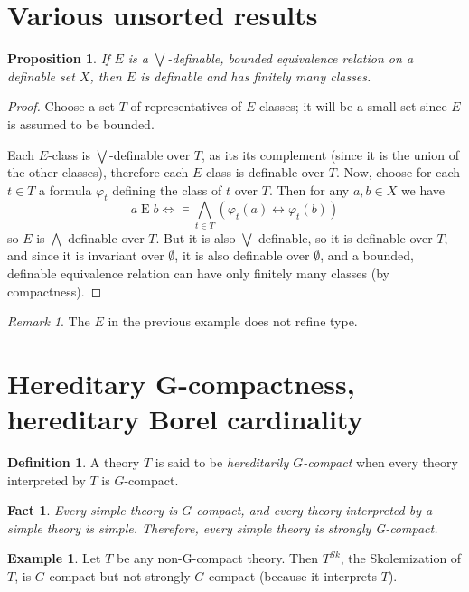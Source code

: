 \documentclass[final,a4paper,12pt]{amsart}
\newcommand{\liff}{\mathrel{\leftrightarrow}}
\newcommand{\bigland}{\bigwedge}
\newcommand{\biglor}{\bigvee}
\newtheorem{fct}[thm]{Fact}
\newtheorem{prop}[thm]{Proposition}
\theoremstyle{remark}
\newtheorem{rem}[thm]{Remark}
\theoremstyle{definition}
\newtheorem{dfn}[thm]{Definition}
\newtheorem{ex}[thm]{Example}
\begin{document}
	
	\section{Various unsorted results}
	\begin{prop}
		If $E$ is a $\biglor$-definable, bounded equivalence relation on a definable set $X$, then $E$ is definable and has finitely many classes.
	\end{prop}
	\begin{proof}
		Choose a set $T$ of representatives of $E$-classes; it will be a small set since $E$ is assumed to be bounded.
		
		Each $E$-class is $\biglor$-definable over $T$, as its its complement (since it is the union of the other classes), therefore each $E$-class is definable over $T$. Now, choose for each $t\in T$ a formula $\varphi_t$ defining the class of $t$ over $T$. Then for any $a,b\in X$ we have
		\[
		a\mathrel{E}b\iff \models \bigland_{t\in T} (\varphi_t(a)\liff \varphi_t(b))
		\]
		so $E$ is $\bigland$-definable over $T$. But it is also $\biglor$-definable, so it is definable over $T$, and since it is invariant over $\emptyset$, it is also definable over $\emptyset$, and a bounded, definable equivalence relation can have only finitely many classes (by compactness).
	\end{proof}
	
	
	
	\begin{rem}
		The $E$ in the previous example does not refine type.
	\end{rem}
	
	\section{Hereditary G-compactness, hereditary Borel cardinality}
	
	\begin{dfn}
		A theory $T$ is said to be \emph{hereditarily $G$-compact} when every theory interpreted by $T$ is $G$-compact.
	\end{dfn}
	
	\begin{fct}
		Every simple theory is $G$-compact, and every theory interpreted by a simple theory is simple. Therefore, every simple theory is strongly G-compact.
	\end{fct}
	
	
	\begin{ex}
		Let $T$ be any non-G-compact theory. Then $T^{Sk}$, the Skolemization of $T$, is $G$-compact but not strongly $G$-compact (because it interprets $T$).
	\end{ex}
	
\end{document}
